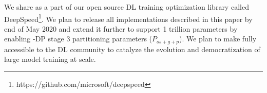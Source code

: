 We share \name as a part of our open source DL training optimization library called DeepSpeed\footnote{https://github.com/microsoft/deepspeed}.
We plan to release all implementations described in this paper by end of May 2020 and extend it further to support 1 trillion parameters by enabling \name-DP stage 3 partitioning parameters ($P_{os+g+p}$). We plan to make \name fully accessible to the DL community to catalyze the evolution and democratization of large model training at scale.  
 

